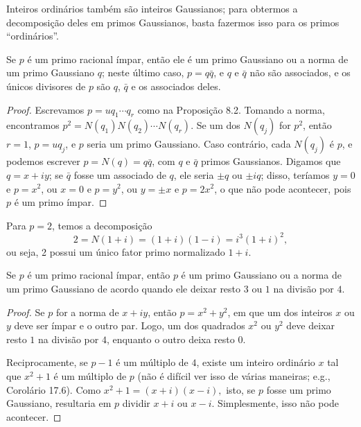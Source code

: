 Inteiros ordinários também são inteiros Gaussianos; para obtermos a
decomposição deles em primos Gaussianos, basta fazermos isso para os
primos ``ordinários''.

\begin{proposicao}
Se $p$ é um primo racional ímpar, então ele é um primo Gaussiano ou a
norma de um primo Gaussiano $q$; neste último caso,
$p = q\bar{q}$, e $q$ e $\bar{q}$ não são associados, e os únicos
divisores de $p$ são $q$, $\bar{q}$ e os associados deles.
\end{proposicao}

\begin{proof}
Escrevamos $p = u q_1 \cdots q_r$ como na Proposição 8.2.
Tomando a norma, encontramos $p^2 = N(q_1) N(q_2) \cdots N(q_r)$.
Se um dos $N(q_j)$ for $p^2$, então $r = 1$, $p = u q_j$, e $p$ seria um
primo Gaussiano. Caso contrário, cada $N(q_j)$ é $p$, e podemos escrever
$p = N(q) = q \bar{q}$, com $q$ e $\bar{q}$ primos Gaussianos. Digamos 
que $q = x + iy$; se $\bar{q}$ fosse um associado de $q$, ele seria 
$\pm q$ ou $\pm iq$; disso, teríamos $y = 0$ e $p = x^2$, ou $x = 0$ e $p = y^2$, 
ou $y = \pm x$ e $p = 2x^2$, o que não pode acontecer, pois $p$ é um primo ímpar.
\end{proof}

Para $p = 2$, temos a decomposição
\[
2 = N(1 + i) = (1 + i)(1 - i) = i^3(1 + i)^2,
\]
ou seja, 2 possui um único fator primo normalizado $1 + i$.

\begin{proposicao}
Se $p$ é um primo racional ímpar, então $p$ é um primo Gaussiano ou a
norma de um primo Gaussiano de acordo quando ele deixar resto $3$ ou $1$
na divisão por $4$.
\end{proposicao}

\begin{proof}
Se $p$ for a norma de $x + iy$, então $p = x^2 + y^2$,
em que um dos inteiros $x$ ou $y$ deve ser ímpar e o outro par.
Logo, um dos quadrados $x^2$ ou $y^2$ deve deixar resto $1$ na divisão
por $4$, enquanto o outro deixa resto $0$.

Reciprocamente, se $p - 1$ é um múltiplo de $4$, existe um inteiro
ordinário $x$ tal que $x^2 + 1$ é um múltiplo de $p$ (não é difícil ver
isso de várias maneiras; e.g., Corolário 17.6). Como
$x^2 + 1 = (x + i)(x - i),$
isto, se $p$ fosse um primo Gaussiano, resultaria em $p$ dividir
$x + i$ ou $x - i$. Simplesmente, isso não pode acontecer. 
\end{proof}

